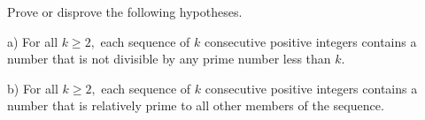 Prove or disprove the following hypotheses.

a) For all $k \geq  2,$ each sequence of $k$ consecutive positive integers contains a number that is not divisible by any prime number less than $k.$

b) For all $k\geq 2,$ each sequence of $k$ consecutive positive integers contains a number that is relatively prime to all other members of the sequence.